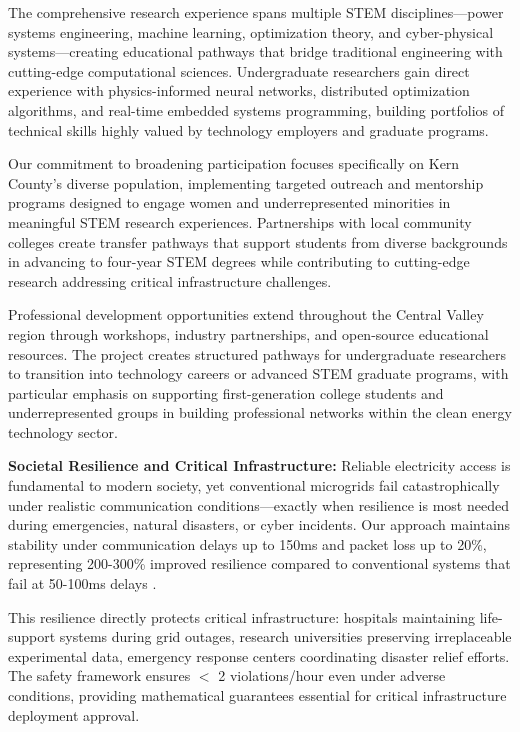\documentclass[12pt]{article}
\begin{document}
The comprehensive research experience spans multiple STEM disciplines—power systems engineering, machine learning, optimization theory, and cyber-physical systems—creating educational pathways that bridge traditional engineering with cutting-edge computational sciences. Undergraduate researchers gain direct experience with physics-informed neural networks, distributed optimization algorithms, and real-time embedded systems programming, building portfolios of technical skills highly valued by technology employers and graduate programs.

Our commitment to broadening participation focuses specifically on Kern County's diverse population, implementing targeted outreach and mentorship programs designed to engage women and underrepresented minorities in meaningful STEM research experiences. Partnerships with local community colleges create transfer pathways that support students from diverse backgrounds in advancing to four-year STEM degrees while contributing to cutting-edge research addressing critical infrastructure challenges.

Professional development opportunities extend throughout the Central Valley region through workshops, industry partnerships, and open-source educational resources. The project creates structured pathways for undergraduate researchers to transition into technology careers or advanced STEM graduate programs, with particular emphasis on supporting first-generation college students and underrepresented groups in building professional networks within the clean energy technology sector.

\textbf{Societal Resilience and Critical Infrastructure:} Reliable electricity access is fundamental to modern society, yet conventional microgrids fail catastrophically under realistic communication conditions—exactly when resilience is most needed during emergencies, natural disasters, or cyber incidents. Our approach maintains stability under communication delays up to 150ms and packet loss up to 20\%, representing 200-300\% improved resilience compared to conventional systems that fail at 50-100ms delays \cite{baseline2023delay}.

This resilience directly protects critical infrastructure: hospitals maintaining life-support systems during grid outages, research universities preserving irreplaceable experimental data, emergency response centers coordinating disaster relief efforts. The safety framework ensures $<$ 2 violations/hour even under adverse conditions, providing mathematical guarantees essential for critical infrastructure deployment approval.
\end{document}
